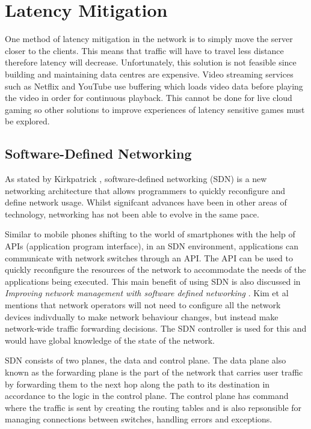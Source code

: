 \section{Latency Mitigation}
One method of latency mitigation in the network is to simply move the server closer to the clients. This means that traffic will have to travel less distance therefore latency will decrease. Unfortunately, this solution is not feasible since building and maintaining data centres are expensive. Video streaming services such as Netflix and YouTube use buffering which loads video data before playing the video in order for continuous playback. This cannot be done for live cloud gaming so other solutions to improve experiences of latency sensitive games must be explored.

\subsection{Software-Defined Networking}
As stated by Kirkpatrick \cite{kirkpatrick2013software}, software-defined networking (SDN) is a new networking architecture that allows programmers to quickly reconfigure and define network usage. Whilst signifcant advances have been in other areas of technology, networking has not been able to evolve in the same pace.
\newline
\par
Similar to mobile phones shifting to the world of smartphones with the help of APIs (application program interface), in an SDN environment, applications can communicate with network switches through an API. The API can be used to quickly reconfigure the resources of the network to accommodate the needs of the applications being executed. This main benefit of using SDN is also discussed in \textit{Improving network management with software defined networking} \cite{kim2013improving}. Kim et al mentions that network operators will not need to configure all the network devices indivdually to make network behaviour changes, but instead make network-wide traffic forwarding decisions. The SDN controller is used for this and would have global knowledge of the state of the network.
\newline
\par
SDN consists of two planes, the data and control plane. The data plane also known as the forwarding plane is the part of the network that carries user traffic by forwarding them to the next hop along the path to its destination in accordance to the logic in the control plane. The control plane has command where the traffic is sent by creating the routing tables and is also repsonsible for managing connections between switches, handling errors and exceptions.

